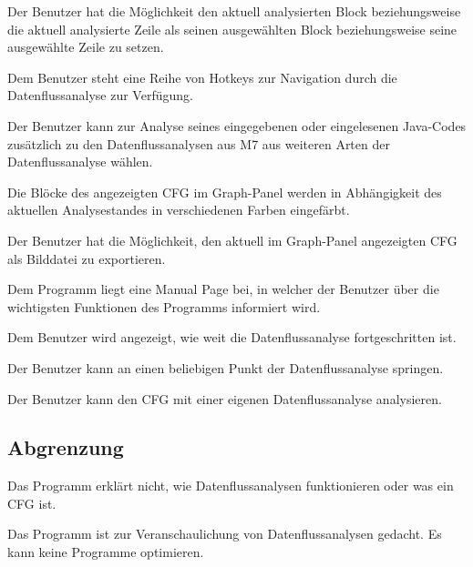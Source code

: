 Der Benutzer hat die Möglichkeit den aktuell analysierten Block beziehungsweise die aktuell analysierte Zeile als seinen ausgewählten Block beziehungsweise seine ausgewählte Zeile zu setzen.

Dem Benutzer steht eine Reihe von Hotkeys zur Navigation durch die
Datenflussanalyse zur Verfügung.

Der Benutzer kann zur Analyse seines eingegebenen oder eingelesenen Java-Codes
zusätzlich zu den Datenflussanalysen aus M7 aus weiteren Arten der Datenflussanalyse
wählen.

Die Blöcke des angezeigten CFG im Graph-Panel werden in
Abhängigkeit des aktuellen Analysestandes in verschiedenen Farben eingefärbt.

Der Benutzer hat die Möglichkeit, den aktuell im Graph-Panel angezeigten CFG als Bilddatei zu exportieren. 

Dem Programm liegt eine Manual Page bei, in welcher der Benutzer über die wichtigsten Funktionen des Programms informiert wird.

Dem Benutzer wird angezeigt, wie weit die Datenflussanalyse fortgeschritten ist.

Der Benutzer kann an einen beliebigen Punkt der Datenflussanalyse springen.

Der Benutzer kann den CFG mit einer eigenen Datenflussanalyse analysieren.

\subsection{Abgrenzung}

Das Programm erklärt nicht, wie Datenflussanalysen funktionieren oder was ein CFG ist.

Das Programm ist zur Veranschaulichung von Datenflussanalysen gedacht. Es kann keine Programme optimieren.

